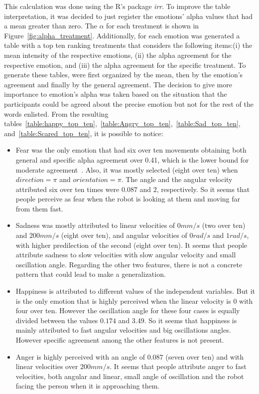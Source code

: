 This calculation was done using the R's package \textit{irr}. To improve the table interpretation, it was decided to just register the emotions' alpha values that had a mean greater than zero. The $\alpha$ for each treatment is shown in Figure~\ref{fig:alpha_treatment}. Additionally, for each emotion was generated a table with a top ten ranking treatments that considers the following items:(i) the mean intensity of the respective emotions, (ii) the alpha agreement for the respective emotion, and (iii) the alpha agreement for the specific treatment. To generate these tables, were first organized by the mean, then by the emotion's agreement and finally by the general agreement.
The decision to give more importance to emotion's alpha was taken based on the situation that the participants could be agreed about the precise emotion but not for the rest of the words enlisted. 
From the resulting tables~\ref{table:happy_top_ten},~\ref{table:Angry_top_ten},~\ref{table:Sad_top_ten}, and~\ref{table:Scared_top_ten}, it is possible to notice:

\begin{itemize}

	\item Fear was the only emotion that had six over ten movements obtaining both general and specific alpha agreement over 0.41, which is the lower bound for moderate agreement~\cite{Viera2005}. Also, it was mostly selected (eight over ten) when $direction = \pi$ and $orientation = \pi$. The angle and the angular velocity attributed six over ten times were $0.087$ and $2$, respectively. So it seems that people perceive as fear when the robot is looking at them and moving far from them fast. 
	
	\item Sadness was mostly attributed to linear velocities of $0 mm/s$ (two over ten) and $200 mm/s$ (eight over ten), and angular velocities of $0 rad/s$ and $1 rad/s$, with higher predilection of the second (eight over ten). It seems that people attribute sadness to slow velocities with slow angular velocity and small oscillation angle. Regarding the other two features, there is not a concrete pattern that could lead to make a generalization. 

	\item Happiness is attributed to different values of the independent variables. But it is the only emotion that is highly perceived when the linear velocity is $0$ with four over ten. However the oscillation angle for these four cases is equally divided between the values $0.174$ and $3.49$. So it seems that happiness is mainly attributed to fast angular velocities and big oscillations angles. However specific agreement among the other features is not present.

	\item Anger is highly perceived with an angle of $0.087$ (seven over ten) and with linear velocities over $200 mm/s$. It seems that people attribute anger to fast velocities, both angular and linear, small angle of oscillation and the robot facing the person when it is approaching them. 
\end{itemize} 

